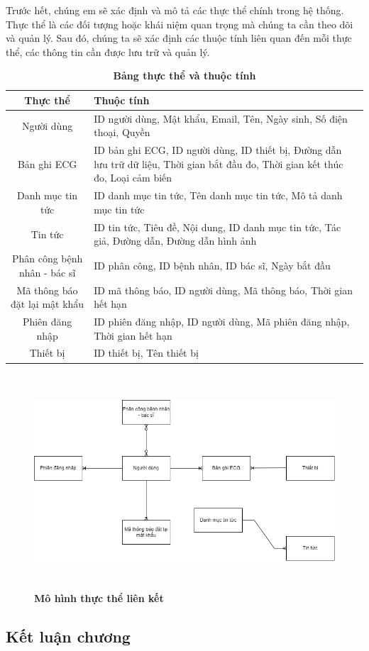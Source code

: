     Trước hết, chúng em sẽ xác định và mô tả các thực thể chính trong hệ
      thống. Thực thể là các đối tượng hoặc khái niệm quan
       trọng mà chúng ta cần theo dõi và quản lý. Sau đó, chúng ta sẽ xác
        định các thuộc tính liên quan đến mỗi thực thể, các thông tin cần
         được lưu trữ và quản lý.

\begin{table}[H]
  \caption{\bfseries \fontsize{12pt}{0pt}\selectfont Bảng thực thể và thuộc tính}
  \centering
  \begin{tabularx}{0.9\textwidth}{|c|X|}
    \hline
    \textbf{Thực thể} & \textbf{Thuộc tính} \\
    \hline
    Người dùng & 
    ID người dùng, Mật khẩu, Email, Tên, Ngày sinh, Số điện thoại, Quyền \\
    \hline
    Bản ghi ECG & 
    ID bản ghi ECG, ID người dùng, ID thiết bị, Đường dẫn lưu trữ dữ liệu, Thời gian bắt đầu đo, Thời gian kết thúc đo, Loại cảm biến \\
    \hline
    Danh mục tin tức & 
    ID danh mục tin tức, Tên danh mục tin tức, Mô tả danh mục tin tức \\
    \hline
    Tin tức & 
    ID tin tức, Tiêu đề, Nội dung, ID danh mục tin tức, Tác giả, Đường dẫn, Đường dẫn hình ảnh \\
    \hline
    Phân công bệnh nhân - bác sĩ & 
    ID phân công, ID bệnh nhân, ID bác sĩ, Ngày bắt đầu \\
    \hline
    Mã thông báo đặt lại mật khẩu & 
    ID mã thông báo, ID người dùng, Mã thông báo, Thời gian hết hạn \\
    \hline
    Phiên đăng nhập & 
    ID phiên đăng nhập, ID người dùng, Mã phiên đăng nhập, Thời gian hết hạn \\
    \hline
    Thiết bị & 
    ID thiết bị, Tên thiết bị \\
    \hline
  \end{tabularx}
\end{table}

\begin{figure}[H]
  \centering
  \includegraphics[width=15cm,height=8cm]{Images/server/database/ttlk.png}
  \caption[Mô hình thực thể liên kết]{\bfseries \fontsize{12pt}{0pt}
  \selectfont Mô hình thực thể liên kết}
  \label{ttlk} %
\end{figure}

\subsection{Kết luận chương}

\newpage
